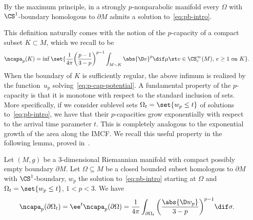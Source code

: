\begin{Remark}
By the maximum principle, in a strongly $p$-nonparabolic manifold every $\Omega$ with $\CS^{1}$-boundary homologous to $\partial M$ admits a solution to~\eqref{eq:pb-intro}.
\end{Remark}

This definition naturally comes with the notion of the $p$-capacity of a compact subset $K \subset M$, which we recall to be
\begin{equation*}%
 \ncapa_p(K) = \inf \set{\frac{1}{4\pi}\bigg(\frac{p-1}{3-p}\bigg)^{p-1}\int_{M\smallsetminus K} \abs{\D v}^p \dif \mu\st v \in \CS_c^\infty(M),\, v \geq 1\text{ on } K}.
\end{equation*}
When the boundary of $K$ is sufficiently regular, the above infimum is realized by the function~$u_p$ solving~\eqref{eq:p-cap-potential}. A fundamental property of the $p$-capacity is that it is monotone with respect to the standard inclusion of sets. More specifically, if we consider sublevel sets $\Omega_t=\set{w_p \leq t}$ of solutions to~\eqref{eq:pb-intro}, we have that their $p$-capacities grow exponentially with respect to the arrival time parameter $t$. This is
completely analogous to the exponential growth of the area along the IMCF. We recall this useful property in the following lemma, proved in~\cite[Lemma~3.8]{holopainen_nonlinearpotentialtheoryquasiregular_1990}.

\begin{Lemma}
Let $(M,g)$ be a $3$-dimensional Riemannian manifold with compact possibly empty boundary $\partial M$. Let $\Omega\subseteq M$ be a closed bounded subset homologous to $\partial M$ with $\CS^1$-boundary, $w_p$ the solution to~\eqref{eq:pb-intro} starting at $\Omega$ and $\Omega_t= \set{w_p \leq t}$, $1<p<3$. We have
\[
 \ncapa_p(\partial \Omega_t) = \ee^{t} \ncapa_p(\partial \Omega)= \frac{1}{4\pi}\int_{\partial \Omega_t} \bigg(\frac{ \abs{ \D w_p}}{3-p}\bigg)^{p-1}\dif \sigma.
\]
\end{Lemma}
